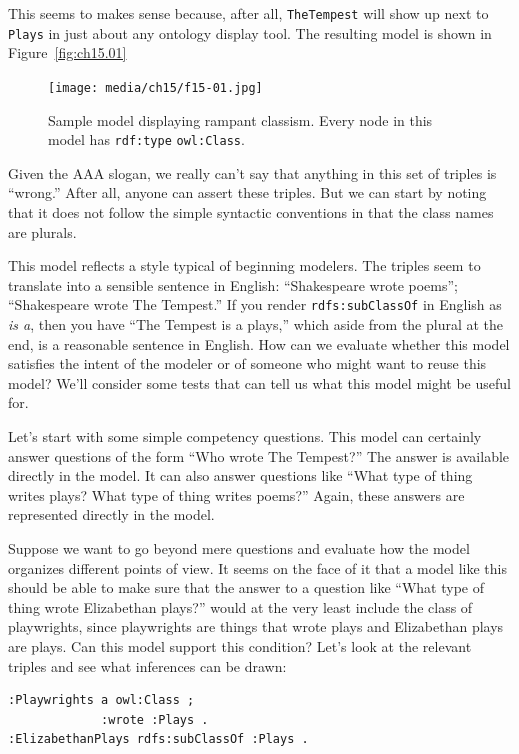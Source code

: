 This seems to makes sense because, after all, \texttt{TheTempest} will show up
next to \texttt{Plays} in just about any ontology display tool. The resulting
model is shown in Figure~\ref{fig:ch15.01}


\begin{figure}
\centering
\texttt{[image: media/ch15/f15-01.jpg]}
\caption{Sample model displaying rampant classism. Every node in this model has
\texttt{rdf:type} \texttt{owl:Class}.
}
\label{fig:ch14.01}
\end{figure}


Given the AAA slogan, we really can't say that anything in this set of
triples is ``wrong.'' After all, anyone can assert these triples. But we
can start by noting that it does not follow the simple syntactic
conventions in that the class names are plurals.

This model reflects a style typical of beginning modelers. The triples
seem to translate into a sensible sentence in English: ``Shakespeare
wrote poems''; ``Shakespeare wrote The Tempest.'' If you render
\texttt{rdfs:subClassOf} in English as \emph{is a}, then you have ``The Tempest is a
plays,'' which aside from the plural at the end, is a reasonable
sentence in English. How can we evaluate whether this model satisfies
the intent of the modeler or of someone who might want to reuse this
model? We'll consider some tests that can tell us what this model might
be useful for.

Let's start with some simple competency questions. This model can
certainly answer questions of the form ``Who wrote The Tempest?'' The
answer is available directly in the model. It can also answer questions
like ``What type of thing writes plays? What type of thing writes
poems?'' Again, these answers are represented directly in the model.

Suppose we want to go beyond mere questions and evaluate how the model
organizes different points of view. It seems on the face of it that a
model like this should be able to make sure that the answer to a
question like ``What type of thing wrote Elizabethan plays?'' would at
the very least include the class of playwrights, since playwrights are
things that wrote plays and Elizabethan plays are plays. Can this model
support this condition? Let's look at the relevant triples and see what
inferences can be drawn:

\begin{lstlisting}
:Playwrights a owl:Class ;
             :wrote :Plays .
:ElizabethanPlays rdfs:subClassOf :Plays .
\end{lstlisting}

